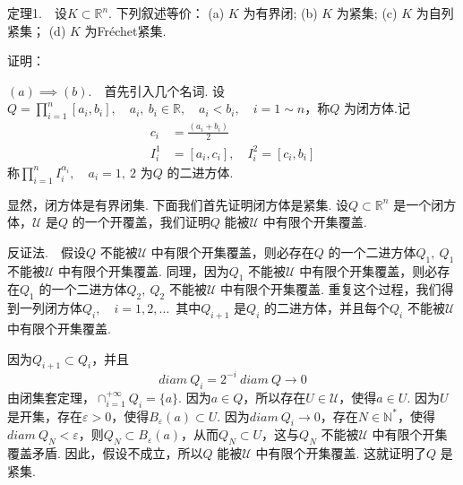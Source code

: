 \documentclass{article}
\begin{document}
定理1.\ \ 设\(K \subset \mathbb{R}^n\). 下列叙述等价：\newline
(a) \(K\) 为有界闭;\newline
(b) \(K\) 为紧集;\newline
(c) \(K\) 为自列紧集；\newline
(d) \(K\) 为Fréchet紧集.

\newpage

证明：

\((a) \implies (b)\).\ \ 首先引入几个名词. 设\(Q = \prod_{i=1}^n [a_i,b_i],\quad a_i,\ b_i \in \mathbb{R},\quad a_i < b_i,\quad i = 1 \sim n\)，称\(Q\) 为闭方体.记
\begin{align*}
    c_i &= \frac{(a_i + b_i)}{2} \\
    I_i^1 &=[a_i,c_i],\quad I_i^2 =[c_i,b_i]
\end{align*}
称\(\prod_{i=1}^n I_i^{\alpha _{i}},\quad a_i = 1,\ 2\) 为\(Q\) 的二进方体.

\vspace{10pt}

显然，闭方体是有界闭集. 下面我们首先证明闭方体是紧集. 设\(Q \subset \mathbb{R}^n\) 是一个闭方体，\(\mathcal{U}\) 是\(Q\) 的一个开覆盖，我们证明\(Q\) 能被\(\mathcal{U}\) 中有限个开集覆盖.

\vspace{20pt}

反证法.\ \ 假设\(Q\) 不能被\(\mathcal{U}\) 中有限个开集覆盖，则必存在\(Q\) 的一个二进方体\(Q_1,\ Q_1\) 不能被\(\mathcal{U}\) 中有限个开集覆盖. 同理，因为\(Q_1\) 不能被\(\mathcal{U}\) 中有限个开集覆盖，则必存在\(Q_1\) 的一个二进方体\(Q_{2},\ Q_2\) 不能被\(\mathcal{U}\) 中有限个开集覆盖. 重复这个过程，我们得到一列闭方体\(Q_i,\quad i = 1,2,\dots \)\ 其中\(Q_{i + 1}\) 是\(Q_i\) 的二进方体，并且每个\(Q_i\) 不能被\(\mathcal{U}\) 中有限个开集覆盖.

\vspace{10pt}

因为\(Q_{i + 1} \subset Q_{i}\)，并且
\begin{equation*}
    diam\ Q_i = 2^{ - i}\ diam\ Q \to 0
\end{equation*}
由闭集套定理，\(\cap _{i = 1}^{ + \infty }Q_i = \{a\} \). 因为\(a \in Q\)，所以存在\(U \in \mathcal{U}\)，使得\(a \in U\). 因为\(U\) 是开集，存在\(\varepsilon > 0\)，使得\(B_{\varepsilon }(a)\subset U\). 因为\(diam\ Q_i \to 0\)，存在\(N \in \mathbb{N}^{*}\)，使得\(diam\ Q_N < \varepsilon \)，则\(Q_{N} \subset B_{\varepsilon }(a)\)，从而\(Q_N \subset U\)，这与\(Q_N\) 不能被\(\mathcal{U}\) 中有限个开集覆盖矛盾. 因此，假设不成立，所以\(Q\) 能被\(\mathcal{U}\) 中有限个开集覆盖. 这就证明了\(Q\) 是紧集.
\end{document}
